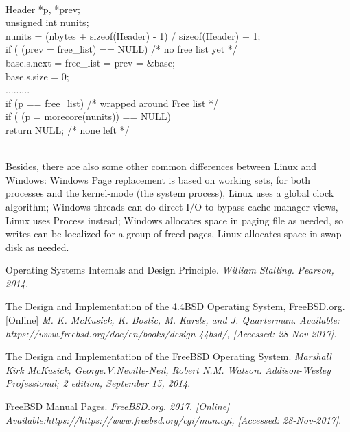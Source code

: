 \documentclass[10pt,draftclsnofoot,peerreview,letterpaper,onecolumn,]{IEEEtran}
\begin{document}
~\\{  Header *p, *prev;
~\\   unsigned int nunits;
~\\   nunits = (nbytes + sizeof(Header) - 1) / sizeof(Header) + 1;
~\\   if ( (prev = free\_list) == NULL) {		/* no free list yet */
~\\     base.s.next = free\_list = prev = \&base;
~\\     base.s.size = 0;}
~\\.........
~\\   if (p == free\_list)		/* wrapped around Free list */
~\\   if ( (p = morecore(nunits)) == NULL)
~\\      return NULL;		/* none left */



~\\Besides, there are also some other common differences between Linux and Windows: Windows Page replacement is based on working sets, for both processes and the kernel-mode (the system process), Linux uses a global clock algorithm; Windows threads can do direct I/O to bypass cache manager views, Linux uses Process instead; Windows allocates space in paging file as needed, so writes can be localized for a group of freed pages, Linux allocates space in swap disk as needed.




\begin{thebibliography}{1}

 Operating Systems Internals and Design Principle.
\textit{William Stalling.}
\textit{Pearson, 2014}.

 The Design and Implementation of the 4.4BSD Operating System, FreeBSD.org.[Online]
\textit{M. K. McKusick, K. Bostic, M. Karels, and J. Quarterman.}
\textit{Available: https://www.freebsd.org/doc/en/books/design-44bsd/, [Accessed: 28-Nov-2017]}.

 The Design and Implementation of the FreeBSD Operating System.
\textit{Marshall Kirk McKusick, George.V.Neville-Neil, Robert N.M. Watson.}
\textit{Addison-Wesley Professional; 2 edition, September 15, 2014}.

FreeBSD Manual Pages.
\textit{FreeBSD.org. 2017. [Online] }
~\\ \textit{Available:https://https://www.freebsd.org/cgi/man.cgi, [Accessed: 28-Nov-2017]}.


\end{thebibliography}}
\end{document}
